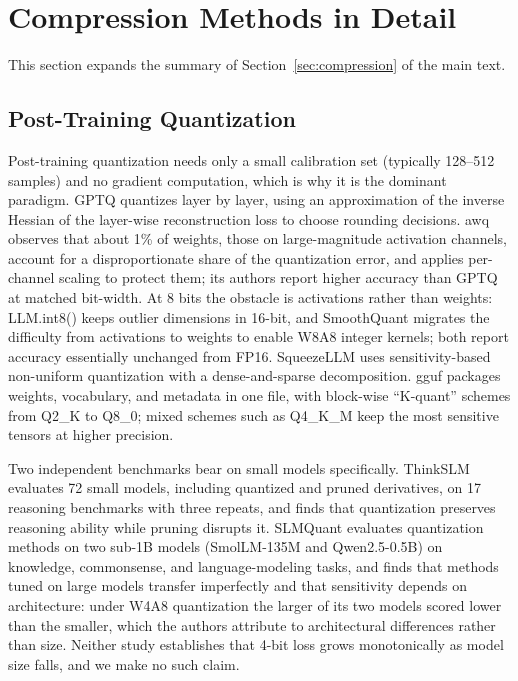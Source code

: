 
\section{Compression Methods in Detail}
\label{supp:compression}

This section expands the summary of Section~\ref{sec:compression} of the main text.

\subsection{Post-Training Quantization}

Post-training quantization needs only a small calibration set (typically 128--512 samples) and no gradient computation, which is why it is the dominant paradigm. GPTQ \citep{frantar2023gptq} quantizes layer by layer, using an approximation of the inverse Hessian of the layer-wise reconstruction loss to choose rounding decisions. \gls{awq} \citep{lin2024awq} observes that about 1\% of weights, those on large-magnitude activation channels, account for a disproportionate share of the quantization error, and applies per-channel scaling to protect them; its authors report higher accuracy than GPTQ at matched bit-width. At 8 bits the obstacle is activations rather than weights: LLM.int8() \citep{dettmers2022llmint8} keeps outlier dimensions in 16-bit, and SmoothQuant \citep{xiao2023smoothquant} migrates the difficulty from activations to weights to enable W8A8 integer kernels; both report accuracy essentially unchanged from FP16. SqueezeLLM \citep{kim2024squeezellm} uses sensitivity-based non-uniform quantization with a dense-and-sparse decomposition. \gls{gguf} \citep{gerganov2023llamacpp} packages weights, vocabulary, and metadata in one file, with block-wise ``K-quant'' schemes from Q2\_K to Q8\_0; mixed schemes such as Q4\_K\_M keep the most sensitive tensors at higher precision.

Two independent benchmarks bear on small models specifically. ThinkSLM \citep{srivastava2025thinkslm} evaluates 72 small models, including quantized and pruned derivatives, on 17 reasoning benchmarks with three repeats, and finds that quantization preserves reasoning ability while pruning disrupts it. SLMQuant \citep{slmquant2025} evaluates quantization methods on two sub-1B models (SmolLM-135M and Qwen2.5-0.5B) on knowledge, commonsense, and language-modeling tasks, and finds that methods tuned on large models transfer imperfectly and that sensitivity depends on architecture: under W4A8 quantization the larger of its two models scored lower than the smaller, which the authors attribute to architectural differences rather than size. Neither study establishes that 4-bit loss grows monotonically as model size falls, and we make no such claim.

